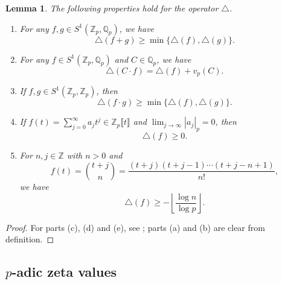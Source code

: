 \documentclass[12pt]{article}
\let\ge\geqslant
\newtheorem{lemma}[theorem]{Lemma}
\theoremstyle{remark}
\numberwithin{equation}{section}
\begin{document}
\begin{lemma}
\label{lem_properties_of_the_triangle_operator}
The following properties hold for the operator $\triangle$.
\begin{enumerate}
\item[\textup{(a)}] For any $f,g \in S^{1}(\mathbb{Z}_{p},\mathbb{Q}_{p})$, we have
\[
\triangle(f + g) \ge \min\{ \triangle(f), \triangle(g) \}.
\]

\item[\textup{(b)}] For any $f \in S^{1}(\mathbb{Z}_{p},\mathbb{Q}_{p})$ and $C \in \mathbb{Q}_p$, we have
\[
\triangle(C \cdot f) = \triangle(f) + v_p(C).
\]

\item[\textup{(c)}] If $f,g \in S^{1}(\mathbb{Z}_{p},\mathbb{Z}_{p})$, then 
\[ 
\triangle(f\cdot g) \ge \min\{\triangle(f),\triangle(g)\}. 
\]

\item[\textup{(d)}] If $f(t) = \sum_{j=0}^{\infty} a_jt^{j} \in \mathbb{Z}_{p}\llbracket t \rrbracket$ and $\lim_{j \to \infty} |a_j|_p = 0$, then 
\[
\triangle(f) \ge 0.
\]

\item[\textup{(e)}] For $n,j \in \mathbb{Z}$ with $n>0$ and 
\[ 
f(t) = \binom{t+j}{n} = \frac{(t+j)(t+j-1)\dotsb(t+j-n+1)}{n!}, 
\] 
we have 
\[ 
\triangle(f) \ge -\left\lfloor \frac{\log n}{\log p} \right\rfloor.
\] 
\end{enumerate} 
\end{lemma}

\begin{proof}
For parts (c), (d) and (e), see \cite[Lemma 2.5]{Lai2025}; parts (a) and (b) are clear from definition.
\end{proof}

\subsection{$p$-adic zeta values}
\end{document}
